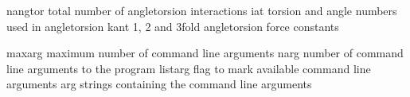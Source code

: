 \documentclass[letterpaper,11pt,english]{sphinxmanual}
\begin{document}

\begin{sphinxVerbatim}[commandchars=\\\{\}]
nangtor         total number of angle\PYGZhy{}torsion interactions
iat             torsion and angle numbers used in angle\PYGZhy{}torsion
kant            1\PYGZhy{}, 2\PYGZhy{} and 3\PYGZhy{}fold angle\PYGZhy{}torsion force constants
\end{sphinxVerbatim}


\begin{sphinxVerbatim}[commandchars=\\\{\}]
maxarg          maximum number of command line arguments
narg            number of command line arguments to the program
listarg         flag to mark available command line arguments
arg             strings containing the command line arguments
\end{sphinxVerbatim}

\end{document}
